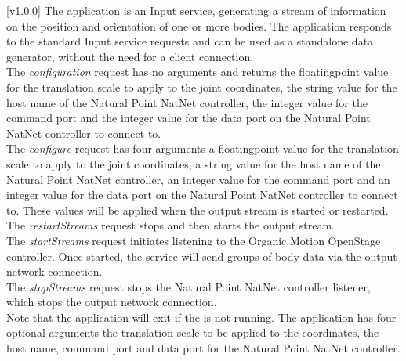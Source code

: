 [v1.0.0]
The  application is an Input service,
generating a stream of information on the position and orientation of one or more bodies.
The application responds to the standard Input service requests and can be used as a
standalone data generator, without the need for a client connection.\\

The \emph{configuration} request has no arguments and returns the floating\longDash{}point
value for the translation scale to apply to the joint coordinates, the string value for
the host name of the Natural Point NatNet controller, the integer value for the command
port and the integer value for the data port on the Natural Point NatNet controller to
connect to.\\

The \emph{configure} request has four arguments \longDash{} a floating\longDash{}point
value for the translation scale to apply to the joint coordinates, a string value for
the host name of the Natural Point NatNet controller, an integer value for the command
port and an integer value for the data port on the Natural Point NatNet controller to
connect to.
These values will be applied when the output stream is started or restarted.\\ 

The \emph{restartStreams} request stops and then starts the output stream.\\

The \emph{startStreams} request initiates listening to the Organic Motion
OpenStage controller.
Once started, the service will send groups of body data via the output \yarp{} network
connection.\\

The \emph{stopStreams} request stops the Natural Point NatNet controller listener, which
stops the output \yarp{} network connection.\\ 

Note that the application will exit if the \emph{\RS} is not running.
The application has four optional arguments \longDash{} the translation scale to be
applied to the coordinates, the host name, command port and data port for the Natural
Point NatNet controller.
\insertAppParameters
\insertTagDescription{\NNBI}
\insertInputServiceComment\\

